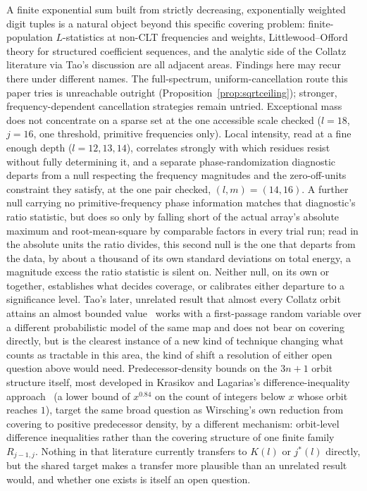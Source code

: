 \documentclass[11pt]{amsart}
\theoremstyle{plain}
\theoremstyle{definition}
\theoremstyle{remark}
\begin{document}
A finite exponential sum built from strictly decreasing, exponentially weighted digit tuples is a
natural object beyond this specific covering problem: finite-population $L$-statistics at non-CLT
frequencies and weights, Littlewood--Offord theory for structured coefficient sequences, and the
analytic side of the Collatz literature via Tao's discussion are all adjacent areas. Findings here
may recur there under different names. The full-spectrum, uniform-cancellation route this paper tries
is unreachable outright (Proposition~\ref{prop:sqrtceiling}); stronger, frequency-dependent
cancellation strategies remain untried. Exceptional mass does
not concentrate on a sparse set at the one accessible scale checked ($l=18$, $j=16$, one threshold,
primitive frequencies only). Local intensity, read at a fine enough depth ($l=12,13,14$), correlates
strongly with
which residues resist without fully determining it, and a separate phase-randomization diagnostic
departs
from a null respecting the frequency magnitudes and the zero-off-units constraint they satisfy, at
the one pair checked, $(l,m)=(14,16)$. A further null carrying no
primitive-frequency phase information matches that diagnostic's ratio statistic, but does so only by
falling short of the actual array's absolute maximum and root-mean-square by comparable factors in
every trial run; read in the absolute units the ratio divides, this second null is the one that
departs from the data, by about a thousand of its own standard deviations on total energy, a magnitude
excess the ratio statistic is silent on. Neither null, on its own
or together, establishes what decides coverage, or calibrates either departure to a significance
level. Tao's later, unrelated
result
that almost every Collatz orbit attains an almost bounded value~\cite{tao2019} works with a
first-passage random variable over a different probabilistic model of the same map and does not
bear on covering directly, but is the clearest instance of a new kind of technique changing what
counts as tractable in this area, the kind of shift a resolution of either open question above would
need. Predecessor-density bounds on the $3n+1$ orbit structure itself, most developed in Krasikov
and Lagarias's difference-inequality approach~\cite{krasikovlagarias2003} (a lower bound of
$x^{0.84}$ on the count of integers below $x$ whose orbit reaches $1$), target the same broad
question as Wirsching's own reduction from covering to positive predecessor density, by a different
mechanism: orbit-level difference inequalities rather than the covering structure of one
finite family $R_{j-1,j}$. Nothing in that literature currently transfers to $K(l)$ or $j^*(l)$
directly, but the shared target makes a transfer more plausible than an unrelated result would, and
whether one exists is itself an open question.
\end{document}

